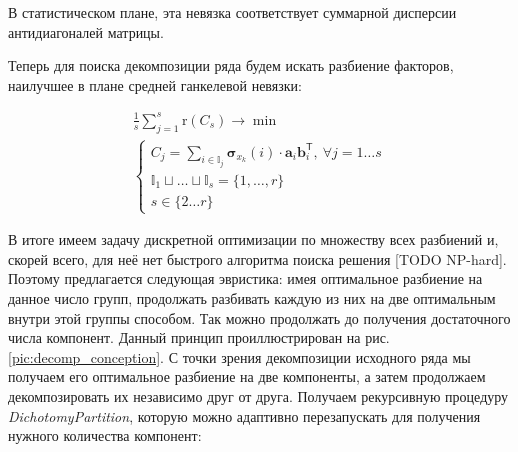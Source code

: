 	    	В статистическом плане, эта невязка соответствует суммарной дисперсии антидиагоналей матрицы.
	    	
	    	Теперь для поиска декомпозиции ряда будем искать разбиение факторов, наилучшее в плане средней ганкелевой невязки:
	    	
	    	\begin{gather*}
	    		\frac{1}{s} \sum\limits_{j = 1}^s \text{r}(C_s) \to \min \\
	    		\begin{cases*}
	    			C_j = \sum\limits_{i \in \mathbb{I}_j} \boldsymbol{\sigma}_{x_k}(i) \cdot \mathbf{a}_i  \mathbf{b}_i^{\mathsf{T}}, \  \forall j = 1 \ldots s \\
	    			\mathbb{I}_1 \sqcup \ldots \sqcup \mathbb{I}_s = \{1, \ldots, r\} \\
	    			s \in \{2 \ldots r\}
	    		\end{cases*}
	    	\end{gather*}
	    	
	    	В итоге имеем задачу дискретной оптимизации по множеству всех разбиений и, скорей всего, для неё нет быстрого алгоритма поиска решения [TODO NP-hard]. Поэтому предлагается следующая эвристика: имея оптимальное разбиение на данное число групп, продолжать разбивать каждую из них на две оптимальным внутри этой группы способом. Так можно продолжать до получения достаточного числа компонент. Данный принцип проиллюстрирован на рис.\ref{pic:decomp_conception}. С точки зрения декомпозиции исходного ряда мы получаем его оптимальное разбиение на две компоненты, а затем продолжаем декомпозировать их независимо друг от друга. Получаем рекурсивную процедуру \emph{DichotomyPartition}, которую можно адаптивно перезапускать для получения нужного количества компонент:
	    	
